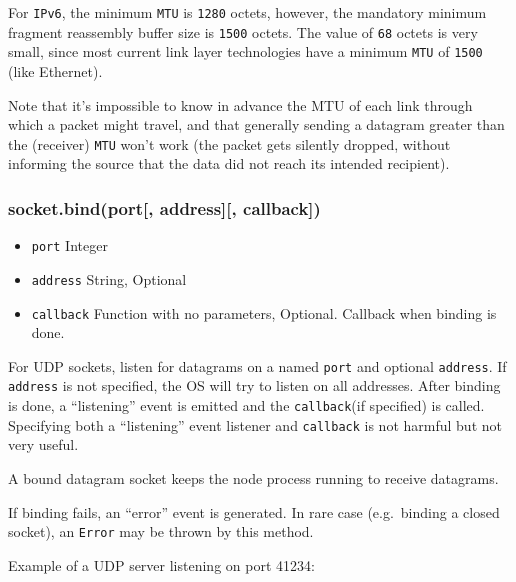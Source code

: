 For \texttt{IPv6}, the minimum \texttt{MTU} is \texttt{1280} octets,
however, the mandatory minimum fragment reassembly buffer size is
\texttt{1500} octets. The value of \texttt{68} octets is very small,
since most current link layer technologies have a minimum \texttt{MTU}
of \texttt{1500} (like Ethernet).

Note that it's impossible to know in advance the MTU of each link
through which a packet might travel, and that generally sending a
datagram greater than the (receiver) \texttt{MTU} won't work (the packet
gets silently dropped, without informing the source that the data did
not reach its intended recipient).

\subsubsection{socket.bind(port{[}, address{]}{[},
callback{]})}\label{socket.bindport-address-callback}

\begin{itemize}
\itemsep1pt\parskip0pt
\item
  \texttt{port} Integer
\item
  \texttt{address} String, Optional
\item
  \texttt{callback} Function with no parameters, Optional. Callback when
  binding is done.
\end{itemize}

For UDP sockets, listen for datagrams on a named \texttt{port} and
optional \texttt{address}. If \texttt{address} is not specified, the OS
will try to listen on all addresses. After binding is done, a
``listening'' event is emitted and the \texttt{callback}(if specified)
is called. Specifying both a ``listening'' event listener and
\texttt{callback} is not harmful but not very useful.

A bound datagram socket keeps the node process running to receive
datagrams.

If binding fails, an ``error'' event is generated. In rare case
(e.g.~binding a closed socket), an \texttt{Error} may be thrown by this
method.

Example of a UDP server listening on port 41234:

